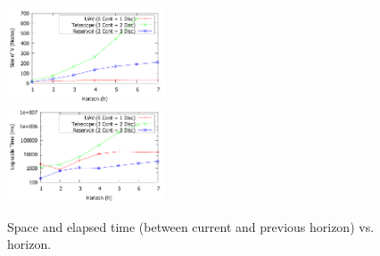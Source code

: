 \documentclass[letterpaper]{article}
\begin{document}
\begin{figure}[tbp!]
\centering

\includegraphics[width=0.42\textwidth]{Figures/Nodes.pdf}\\
\vspace{-3mm}
\includegraphics[width=0.42\textwidth]{Figures/Time.pdf}
\vspace{-3mm}
\caption{\footnotesize Space and elapsed time (between current and previous horizon) vs. horizon.
}
\label{fig:SpaceTime}
\vspace{-1mm}
\end{figure}
\end{document}
